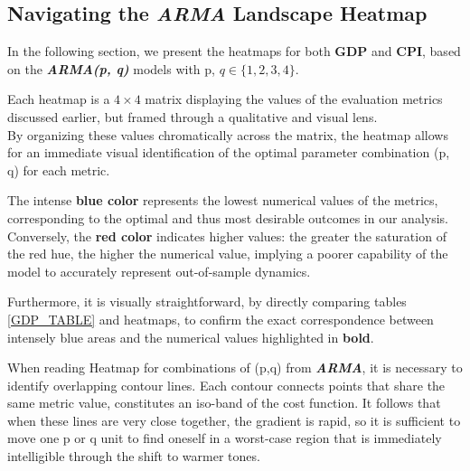 \documentclass{Configuration_Files/PoliMi3i_thesis}
\begin{document}
\subsection{Navigating the \textbf{\textit{ARMA}} Landscape Heatmap}
In the following section, we present the heatmaps for both \textbf{GDP} and \textbf{CPI}, based on the \textbf{\textit{ARMA(p, q)}} models with p,  \(q \in \{1, 2, 3, 4\}\).

Each heatmap is a \(4 \times 4\) matrix displaying the values of the evaluation metrics discussed earlier, but framed through a qualitative and visual lens.\\
By organizing these values chromatically across the matrix, the heatmap allows for an immediate visual identification of the optimal parameter combination (p, q) for each metric.

The intense \textbf{blue color} represents the lowest numerical values of the metrics, corresponding to the optimal and thus most desirable outcomes in our analysis. Conversely, the \textbf{red color} indicates higher values: the greater the saturation of the red hue, the higher the numerical value, implying a poorer capability of the model to accurately represent out-of-sample dynamics.

Furthermore, it is visually straightforward, by directly comparing tables \ref{GDP_TABLE} and heatmaps, to confirm the exact correspondence between intensely blue areas and the numerical values highlighted in \textbf{bold}.

When reading Heatmap for combinations of (p,q) from \textbf{\textit{ARMA}}, it is necessary to identify overlapping contour lines. Each contour connects points that share the same metric value, constitutes an iso-band of the cost function. It follows that when these lines are very close together, the gradient is rapid, so it is sufficient to move one p or q unit to find oneself in a worst-case region that is immediately intelligible through the shift to warmer tones.
\end{document}
